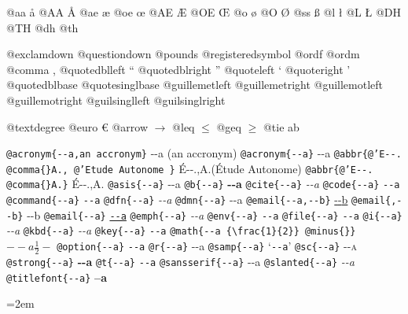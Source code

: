 \documentclass{book}
\begin{document}
@aa \aa{}
@AA \AA{}
@ae \ae{}
@oe \oe{}
@AE \AE{}
@OE \OE{}
@o \o{}
@O \O{}
@ss \ss{}
@l \l{}
@L \L{}
@DH \DH{}
@TH \TH{}
@dh \dh{}
@th \th{}

@exclamdown \textexclamdown{}
@questiondown \textquestiondown{}
@pounds \textsterling{}
@registeredsymbol \circledR{}
@ordf \textordfeminine{}
@ordm \textordmasculine{}
@comma ,
@quotedblleft \textquotedblleft{}
@quotedblright \textquotedblright{}
@quoteleft \textquoteleft{}
@quoteright \textquoteright{}
@quotedblbase \quotedblbase{}
@quotesinglbase \quotesinglbase{}
@guillemetleft \guillemotleft{}
@guillemetright \guillemotright{}
@guillemotleft \guillemotleft{}
@guillemotright \guillemotright{}
@guilsinglleft \guilsinglleft{}
@guilsinglright \guilsinglright{}

@textdegree \textdegree{}
@euro \euro{}
@arrow $\rightarrow{}$
@leq $\leq{}$
@geq $\geq{}$
@tie a\hbox{}b

\texttt{@acronym\{{-}{-}a,an accronym\}} {-}{-}a (an accronym)
\texttt{@acronym\{{-}{-}a\}} {-}{-}a
\texttt{@abbr\{@'E{-}{-}. @comma\{\}A., @'Etude Autonome \}} \'{E}{-}{-}.\@ ,A.\@ (\'{E}tude Autonome)
\texttt{@abbr\{@'E{-}{-}. @comma\{\}A.\}} \'{E}{-}{-}.\@ ,A.\@
\texttt{@asis\{{-}{-}a\}} {-}{-}a
\texttt{@b\{{-}{-}a\}} \textbf{{-}{-}a}
\texttt{@cite\{{-}{-}a\}} \textit{{-}{-}a}
\texttt{@code\{{-}{-}a\}} \texttt{{-}{-}a}
\texttt{@command\{{-}{-}a\}} \texttt{{-}{-}a}
\texttt{@dfn\{{-}{-}a\}} \emph{{-}{-}a}
\texttt{@dmn\{{-}{-}a\}} {-}{-}a
\texttt{@email\{{-}{-}a,{-}{-}b\}} \href{mailto:--a}{{-}{-}b}
\texttt{@email\{,{-}{-}b\}} {-}{-}b
\texttt{@email\{{-}{-}a\}} \href{mailto:--a}{\nolinkurl{--a}}
\texttt{@emph\{{-}{-}a\}} \emph{{-}{-}a}
\texttt{@env\{{-}{-}a\}} \texttt{{-}{-}a}
\texttt{@file\{{-}{-}a\}} \texttt{{-}{-}a}
\texttt{@i\{{-}{-}a\}} \textit{{-}{-}a}
\texttt{@kbd\{{-}{-}a\}} {\ttfamily\textsl{{-}{-}a}}
\texttt{@key\{{-}{-}a\}} \texttt{{-}{-}a}
\texttt{@math\{{-}{-}a \{\textbackslash{}frac\{1\}\{2\}\} @minus\{\}\}} $--a {\frac{1}{2}} -$
\texttt{@option\{{-}{-}a\}} \texttt{{-}{-}a}
\texttt{@r\{{-}{-}a\}} \textrm{{-}{-}a}
\texttt{@samp\{{-}{-}a\}} `\texttt{{-}{-}a}'
\texttt{@sc\{{-}{-}a\}} \textsc{{-}{-}a}
\texttt{@strong\{{-}{-}a\}} \textbf{{-}{-}a}
\texttt{@t\{{-}{-}a\}} \texttt{{-}{-}a}
\texttt{@sansserif\{{-}{-}a\}} \textsf{{-}{-}a}
\texttt{@slanted\{{-}{-}a\}} \textsl{{-}{-}a}
\texttt{@titlefont\{{-}{-}a\}} \endgroup{}%
{\huge \bfseries --a}\par\begingroup\obeylines\obeyspaces\frenchspacing\leftskip=2em\relax\parskip=0pt\relax\ttfamily{}%
\end{document}
